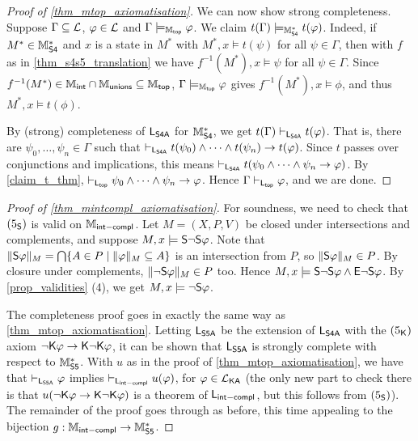 \begin{proof}[Proof of \cref{thm_mtop_axiomatisation}]
We can now show strong completeness. Suppose $\Gamma \subseteq \cL$, $\phi \in
\cL$ and $\Gamma \models_{\Mtop} \phi$. We claim $t(\Gamma) \models_{\Msfour}
t(\phi)$. Indeed, if $M^* \in \Msfour$ and $x$ is a state in $M^*$ with $M^*, x
\models t(\psi)$ for all $\psi \in \Gamma$, then with $f$ as in
\cref{thm_s4s5_translation} we have $f^{-1}(M^*), x \models \psi$ for all $\psi
\in \Gamma$. Since $f^{-1}(M^*) \in \Mint \cap \Munions \subseteq \Mtop$,
$\Gamma \models_{\Mtop} \phi$ gives $f^{-1}(M^*), x \models \phi$, and thus
$M^*, x \models t(\phi)$.

By (strong) completeness of $\sLsfoura$ for $\Msfour$, we get $t(\Gamma)
\entails_{\sLsfoura} t(\phi)$. That is, there are $\psi_0, \ldots, \psi_n \in
\Gamma$ such that $\entails_{\sLsfoura} t(\psi_0) \land \cdots \land t(\psi_n)
\limplies t(\phi)$. Since $t$ passes over conjunctions and implications, this
means $\entails_{\sLsfoura} t(\psi_0 \land \cdots \land \psi_n \limplies
\phi)$. By \cref{claim_t_thm}, $\entails_{\sLtop} \psi_0 \land \cdots \land
\psi_n \limplies \phi$. Hence $\Gamma \entails_{\sLtop} \phi$, and we are done.

\end{proof}

\begin{proof}[Proof of \cref{thm_mintcompl_axiomatisation}]
    For soundness, we need to check that $\fivesoundness$ is valid on
    $\Mintcompl$. Let $M = (X, P, V)$ be closed under intersections and
    complements, and suppose $M, x \models \S\neg\S\phi$. Note that
    $\|\S\phi\|_M = \bigcap\{A \in P \mid \|\phi\|_M \subseteq A\}$ is an
    intersection from $P$, so $\|\S\phi\|_M \in P$. By closure under
    complements, $\|\neg\S\phi\|_M \in P$ too. Hence $M, x \models \S\neg\S\phi
    \land \E\neg\S\phi$. By \cref{prop_validities} (4), we get $M, x \models
    \neg\S\phi$.

    The completeness proof goes in exactly the same way as
    \cref{thm_mtop_axiomatisation}. Letting $\sLsfivea$ be the extension of
    $\sLsfoura$ with the $\fivek$ axiom $\neg\K\phi \limplies \K\neg\K\phi$, it
    can be shown that $\sLsfivea$ is strongly complete with respect to
    $\Msfive$.  With $u$ as in the proof of \cref{thm_mtop_axiomatisation}, we
    have that $\entails_{\sLsfivea} \phi$ implies $\entails_{\sLintcompl}
    u(\phi)$, for $\phi \in \cLKA$ (the only new part to check there is that
    $u(\neg\K\phi \limplies \K\neg\K\phi)$ is a theorem of $\sLintcompl$, but
    this follows from $\fivesoundness$). The remainder of the proof goes
    through as before, this time appealing to the bijection $g: \Mintcompl \to
    \Msfive$.

\end{proof}

